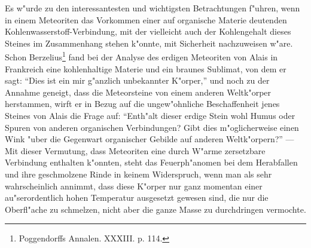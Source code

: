 \documentclass[a4paper, 11pt, oneside]{article}
\begin{document}
Es w"urde zu den interessantesten und wichtigsten Betrachtungen f"uhren, wenn in einem Meteoriten das Vorkommen einer auf organische Materie deutenden Kohlenwasserstoff-Verbindung, mit der vielleicht auch der Kohlengehalt dieses Steines im Zusammenhang stehen k"onnte, mit Sicherheit nachzuweisen w"are. Schon Berzelius\footnote{Poggendorffs Annalen. XXXIII. p. 114.} fand bei der Analyse des erdigen Meteoriten von Alais in Frankreich eine kohlenhaltige Materie und ein braunes Sublimat, von dem er sagt: "`Dies ist ein mir g"anzlich unbekannter K"orper,"' und noch zu der Annahme geneigt, dass die Meteorsteine von einem anderen Weltk"orper herstammen, wirft er in Bezug auf die ungew"ohnliche Beschaffenheit jenes Steines von Alais die Frage auf: "`Enth"alt dieser erdige Stein wohl Humus oder Spuren von anderen organischen Verbindungen? Gibt dies m"oglicherweise einen Wink "uber die Gegenwart organischer Gebilde auf anderen Weltk"orpern?"' --- Mit dieser Vermutung, dass Meteoriten eine durch W"arme zersetzbare Verbindung enthalten k"onnten, steht das Feuerph"anomen bei dem Herabfallen und ihre geschmolzene Rinde in keinem Widerspruch, wenn man als sehr wahrscheinlich annimmt, dass diese K"orper nur ganz momentan einer au"serordentlich hohen Temperatur ausgesetzt gewesen sind, die nur die Oberfl"ache zu schmelzen, nicht aber die ganze Masse zu durchdringen vermochte.
\clearpage
\end{document}
